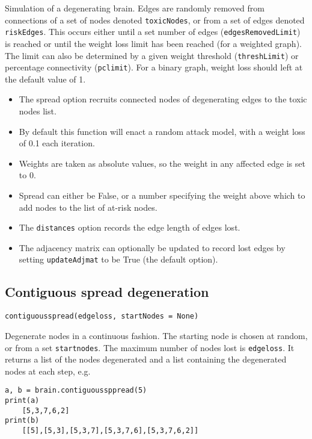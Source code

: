 \documentclass{report}
\begin{document}
Simulation of a degenerating brain. Edges are randomly removed from connections of a set of nodes denoted \texttt{toxicNodes}, or from a set of edges denoted \texttt{riskEdges}. This occurs either until a set number of edges (\texttt{edgesRemovedLimit}) is reached or until the weight loss limit has been reached (for a weighted graph). The limit can also be determined by a given weight threshold (\texttt{threshLimit}) or percentage connectivity (\texttt{pclimit}).  For a binary graph, weight loss should left at the default value of 1.
\begin{itemize}      
\item The spread option recruits connected nodes of degenerating edges to the toxic nodes list.
\item By default this function will enact a random attack model, with a weight loss of 0.1 each iteration.
\item  Weights are taken as absolute values, so the weight in any affected edge is  set to 0.    
\item Spread can either be False, or a number specifying the weight above which to add
        nodes to the list of at-risk nodes.
\item The \texttt{distances} option records the edge length of edges lost.
\item The adjacency matrix can optionally be updated to record lost edges by setting \texttt{updateAdjmat} to be True (the default option).
\end{itemize}

\subsection{Contiguous spread degeneration}

\noindent \texttt{contiguousspread(edgeloss, startNodes = None)} 

\vspace{12pt}

Degenerate nodes in a continuous fashion. The starting node is chosen at random, or from a set \texttt{startnodes}. The maximum number of nodes lost is \texttt{edgeloss}. It returns a list of the nodes degenerated and a list containing the degenerated nodes at each step, e.g.

\begin{verbatim}
a, b = brain.contiguoussppread(5)
print(a)
    [5,3,7,6,2]
print(b)
    [[5],[5,3],[5,3,7],[5,3,7,6],[5,3,7,6,2]]
\end{verbatim}
\end{document}
